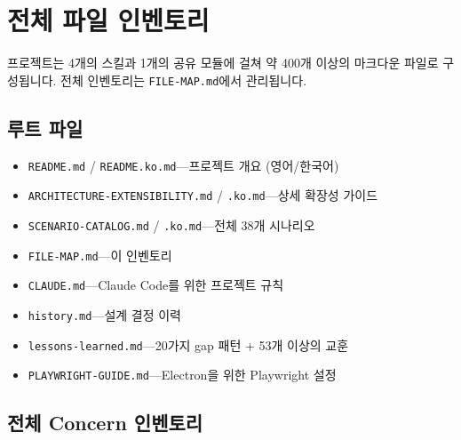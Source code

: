 \documentclass[11pt,a4paper,openright,twoside]{report}
\newcommand{\file}[1]{\texttt{#1}}
\begin{document}
\chapter{전체 파일 인벤토리}
\label{app:inventory}

프로젝트는 4개의 스킬과 1개의 공유 모듈에 걸쳐 약 400개 이상의 마크다운 파일로 구성됩니다. 전체 인벤토리는 \file{FILE-MAP.md}에서 관리됩니다.

\section{루트 파일}

\begin{itemize}
  \item \file{README.md} / \file{README.ko.md}---프로젝트 개요 (영어/한국어)
  \item \file{ARCHITECTURE-EXTENSIBILITY.md} / \file{.ko.md}---상세 확장성 가이드
  \item \file{SCENARIO-CATALOG.md} / \file{.ko.md}---전체 38개 시나리오
  \item \file{FILE-MAP.md}---이 인벤토리
  \item \file{CLAUDE.md}---Claude Code를 위한 프로젝트 규칙
  \item \file{history.md}---설계 결정 이력
  \item \file{lessons-learned.md}---20가지 gap 패턴 + 53개 이상의 교훈
  \item \file{PLAYWRIGHT-GUIDE.md}---Electron을 위한 Playwright 설정
\end{itemize}

\section{전체 Concern 인벤토리}
\label{tab:concerns-full}
\end{document}

